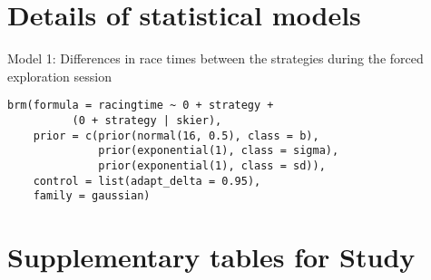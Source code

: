 

\section*{Details of statistical models}\label{study3:estimateddifferencebetweenstrategies}

Model 1: Differences in race times between the strategies during the forced exploration session

\begin{verbatim}
brm(formula = racingtime ~ 0 + strategy + 
          (0 + strategy | skier),
    prior = c(prior(normal(16, 0.5), class = b),
              prior(exponential(1), class = sigma),
              prior(exponential(1), class = sd)),
    control = list(adapt_delta = 0.95),
    family = gaussian)
\end{verbatim}

\clearpage

\section*{Supplementary tables for Study }\label{study1:CIracetime}

